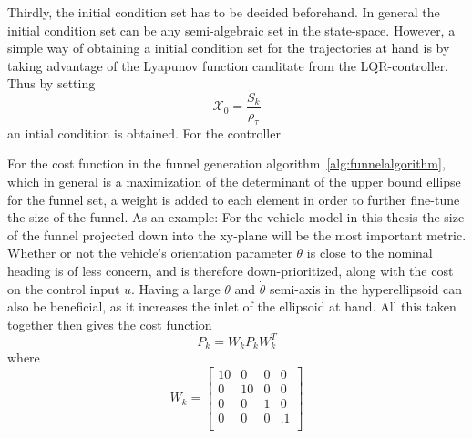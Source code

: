 Thirdly, the initial condition set has to be decided beforehand. In general the
initial condition set can be any semi-algebraic set in the state-space. However,
a simple way of obtaining a initial condition set for the trajectories at hand
is by taking advantage of the Lyapunov function canditate from the
\ac{LQR}-controller. Thus by setting
\begin{equation}
  \mathcal{X}_{0} = \frac{S_{k}}{\rho_{\tau}}
\end{equation}
an intial condition is obtained. For the controller

For the cost function in the funnel generation
algorithm~\ref{alg:funnelalgorithm}, which in general is a maximization of the
determinant of the upper bound ellipse for the funnel set, a weight is added to
each element in order to further fine-tune the size of the funnel. As an
example: For the vehicle model in this thesis the size of the funnel projected
down into the xy-plane will be the most important metric. Whether or not the
vehicle's orientation parameter \(\theta\) is close to the nominal heading is of
less concern, and is therefore down-prioritized, along with the cost on the
control input \(u\). Having a large \(\theta\) and \(\dot{\theta}\) semi-axis in
the hyperellipsoid can also be beneficial, as it increases the inlet of the
ellipsoid at hand. All this taken together then gives the cost function
\begin{equation}
  P_{k} = W_{k}P_{k}W_{k}^{T}
\end{equation}
where
\begin{equation}
  W_{k} =
  \begin{bmatrix}
    10 & 0 & 0 & 0 \\
    0 & 10 & 0 & 0 \\
    0 & 0 & 1 & 0 \\
    0 & 0 & 0 & .1 \\
  \end{bmatrix}
\end{equation}

